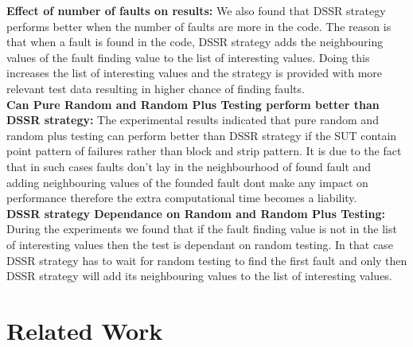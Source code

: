 \documentclass[conference]{IEEEtran}
\begin{document}
\indent \textbf{Effect of number of faults on results:} 
We also found that DSSR strategy performs better when the number of faults are more in the code. The reason is that when a fault is found in the code, DSSR strategy adds the neighbouring values of the fault finding value to the list of interesting values. Doing this increases the list of interesting values and the strategy is provided with more relevant test data resulting in higher chance of finding faults.\\
\indent \textbf{Can Pure Random and Random Plus Testing perform better than DSSR strategy:}
The experimental results indicated that pure random and random plus testing can perform better than DSSR strategy if the SUT contain point pattern of failures rather than block and strip pattern. It is due to the fact that in such cases faults don't lay in the neighbourhood of found fault and adding neighbouring values of the founded fault dont make any impact on performance therefore the extra computational time becomes a liability.\\
\indent \textbf{DSSR strategy Dependance on Random and Random Plus Testing:}
During the experiments we found that if the fault finding value is not in the list of interesting values then the test is dependant on random testing. In that case DSSR strategy has to wait for random testing to find the first fault and only then DSSR strategy will add its neighbouring values to the list of interesting values.



\section{Related Work}\label{sec:rw}
\end{document}
